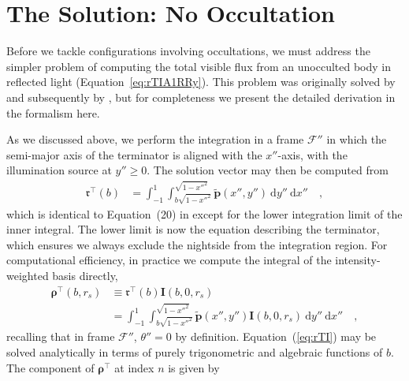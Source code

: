 \documentclass[modern]{aastex62}
\newcommand{\BF}[1]{\ensuremath{\mathbf{#1}}}
\newcommand{\BS}[1]{\ensuremath{\boldsymbol{#1}}}
\newcommand{\dd}{\ensuremath{\mathrm{d}}}
\newcommand{\rT}{\ensuremath{\mathfrak{r}^\top}}
\newcommand{\bp}{\ensuremath{\tilde{\BF{p}}}}
\begin{document}
\section{The Solution: No Occultation}
\label{sec:solution-no-occ}
%
Before we tackle configurations involving occultations, we must address the
simpler problem of computing the total visible flux from an unocculted
body in reflected light (Equation~\ref{eq:rTIA1RRy}). This problem was
originally solved by \citet{Haggard2018} and subsequently by
\citet{Luger2019b}, but for completeness we present the detailed
derivation in the \starry formalism here.

As we discussed above, we perform the integration in a frame
$\mathcal{F}''$
in which the semi-major axis of the terminator is aligned with the
$x''$-axis, with the illumination source at $y'' \ge 0$.
The solution vector may then be computed from
%
\begin{align}
    \label{eq:rT}
    \rT(b) & =
    \int_{-1}^{1}
    \int_{b\sqrt{1 - x''^2}}^{\sqrt{1 - x''^2}}
    \bp(x'', y'')
    \ \dd y'' \ \dd x''
    \quad,
\end{align}
%
which is identical to Equation~(20) in \citet{Luger2019} except for the
lower integration limit of the inner integral. The lower limit is now
the equation describing the terminator, which ensures we always exclude the
nightside from the integration region.
%
For computational efficiency, in practice we compute the integral of the
intensity-weighted basis directly,
%
\begin{align}
    \label{eq:rTI}
    \BS{\rho}^\top(b, r_s) & \equiv
    \rT(b) \mathbf{I}(b, 0, r_s)
    \nonumber                       \\
                           & =
    \int_{-1}^{1}
    \int_{b\sqrt{1 - x''^2}}^{\sqrt{1 - x''^2}}
    \bp(x'', y'')
    \mathbf{I}(b, 0, r_s)
    \ \dd y'' \ \dd x''
    \quad,
\end{align}
%
recalling that in frame $\mathcal{F}''$, $\theta'' = 0$ by
definition.
%
Equation~(\ref{eq:rTI}) may be solved analytically in terms of purely
trigonometric and algebraic functions of $b$. The component of $\BS{\rho}^\top$
at index $n$ is given by
%
\end{document}

